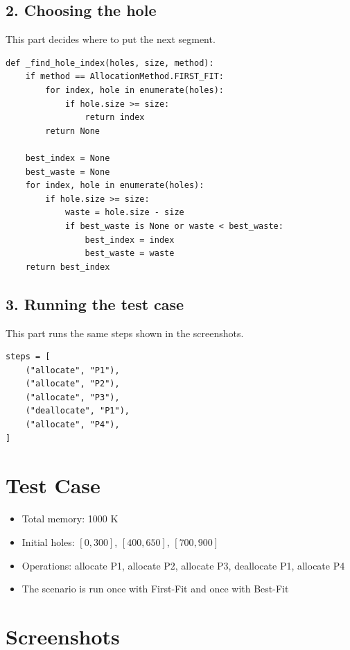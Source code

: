 \documentclass[12pt,a4paper]{report}
\begin{document}
\subsection*{2. Choosing the hole}
This part decides where to put the next segment.
\begin{verbatim}
def _find_hole_index(holes, size, method):
    if method == AllocationMethod.FIRST_FIT:
        for index, hole in enumerate(holes):
            if hole.size >= size:
                return index
        return None

    best_index = None
    best_waste = None
    for index, hole in enumerate(holes):
        if hole.size >= size:
            waste = hole.size - size
            if best_waste is None or waste < best_waste:
                best_index = index
                best_waste = waste
    return best_index
\end{verbatim}

\subsection*{3. Running the test case}
This part runs the same steps shown in the screenshots.
\begin{verbatim}
steps = [
    ("allocate", "P1"),
    ("allocate", "P2"),
    ("allocate", "P3"),
    ("deallocate", "P1"),
    ("allocate", "P4"),
]
\end{verbatim}

\section*{Test Case}
\begin{itemize}
    \item Total memory: 1000 K
    \item Initial holes: $[0,300]$, $[400,650]$, $[700,900]$
    \item Operations: allocate P1, allocate P2, allocate P3, deallocate P1, allocate P4
    \item The scenario is run once with First-Fit and once with Best-Fit
\end{itemize}

\section*{Screenshots}
\end{document}
